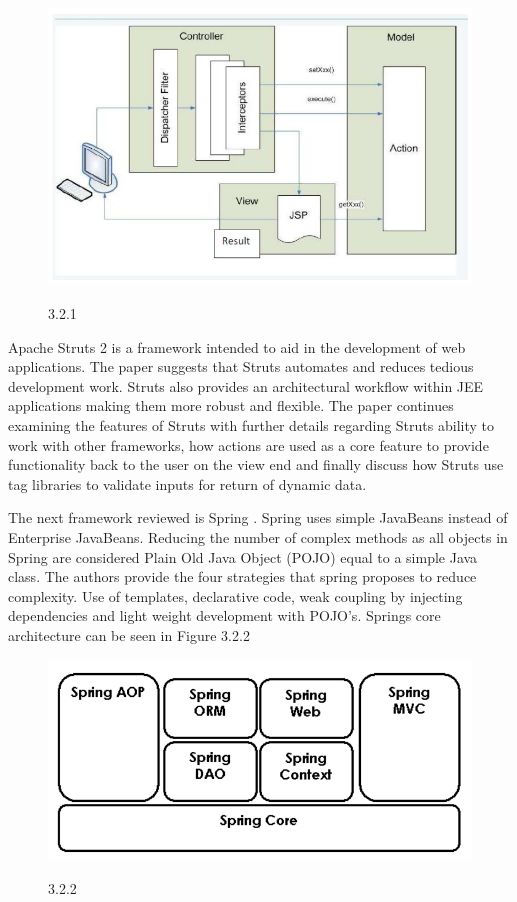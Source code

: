 \documentclass{article}
\begin{document}
				\begin{figure}[!htb]
					\includegraphics[width=.8\textwidth]{img3.png}
					\begin{center}
						\figurename{ 3.2.1}
					\end{center}
				\end{figure}
				
		Apache Struts 2 is a framework intended to aid in the development of web applications. The paper suggests that Struts automates and reduces tedious development work. Struts also provides an architectural workflow within JEE applications making them more robust and flexible. The paper continues examining the features of Struts with further details regarding Struts ability to work with other frameworks, how actions are used as a core feature to provide functionality back to the user on the view end and finally discuss how Struts use tag libraries to validate inputs for return of dynamic data. 

		The next framework reviewed is Spring \cite{springwalls}. Spring uses simple JavaBeans instead of Enterprise JavaBeans. Reducing the number of complex methods as all objects in Spring are considered Plain Old Java Object (POJO) equal to a simple Java class. The authors provide the four strategies that spring proposes to reduce complexity. Use of templates, declarative code, weak coupling by injecting dependencies and light weight development with POJO’s. Springs core architecture can be seen in Figure 3.2.2
			
			\begin{figure}[!htb]
				\includegraphics[width=.8\textwidth]{img4.png}
				\begin{center}
					\figurename{ 3.2.2}
				\end{center}
			\end{figure}
						
\end{document}
